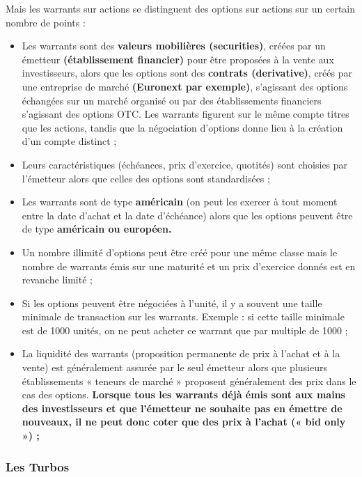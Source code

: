 \documentclass[a4paper]{article}
\begin{document}
Mais les warrants sur actions se distinguent des options sur actions sur un certain nombre de points :
\begin{itemize}
    \item Les warrants sont des \textbf{valeurs mobilières (securities)}, créées par un émetteur \textbf{(établissement financier)} pour être proposées à la vente aux investisseurs, alors que les options sont des \textbf{contrats (derivative)}, créés par une entreprise de marché \textbf{(Euronext par exemple)}, s’agissant des options échangées sur un marché organisé ou par des établissements financiers s’agissant des options OTC. Les warrants figurent sur le même compte titres que les actions, tandis que la négociation d’options donne lieu à la création d’un compte distinct ;

    \item Leurs caractéristiques (échéances, prix d’exercice, quotités) sont choisies par l’émetteur alors que celles des options sont standardisées ;

    \item Les warrants sont de type \textbf{américain} (on peut les exercer à tout moment entre la date d’achat et la date d’échéance) alors que les options peuvent être de type \textbf{américain ou européen.}

    \item Un nombre illimité d’options peut être créé pour une même classe mais le nombre de warrants émis sur une maturité et un prix d’exercice donnés est en revanche limité ;

    \item Si les options peuvent être négociées à l’unité, il y a souvent une taille minimale de transaction sur les warrants. Exemple : si cette taille minimale est de 1000 unités, on ne peut acheter ce warrant que par multiple de 1000 ;

    \item La liquidité des warrants (proposition permanente de prix à l’achat et à la vente) est généralement assurée par le seul émetteur alors que plusieurs établissements « teneurs de marché » proposent généralement des prix dans le cas des options. \textbf{Lorsque tous les warrants déjà émis sont aux mains des investisseurs et que l’émetteur ne souhaite pas en émettre de nouveaux, il ne peut donc coter que des prix à l’achat (« bid only ») ;}
\end{itemize}
\subsubsection{Les Turbos}
\end{document}
